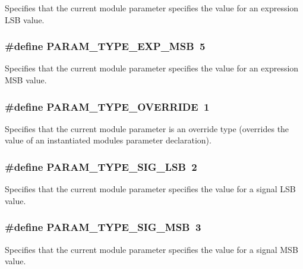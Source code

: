 Specifies that the current module parameter specifies the value for an expression LSB value. 
\subsubsection{\setlength{\rightskip}{0pt plus 5cm}\#define PARAM\_\-TYPE\_\-EXP\_\-MSB\ 5}\label{group__param__suppl_a7}


Specifies that the current module parameter specifies the value for an expression MSB value. 
\subsubsection{\setlength{\rightskip}{0pt plus 5cm}\#define PARAM\_\-TYPE\_\-OVERRIDE\ 1}\label{group__param__suppl_a3}


Specifies that the current module parameter is an override type (overrides the value of an instantiated modules parameter declaration). 
\subsubsection{\setlength{\rightskip}{0pt plus 5cm}\#define PARAM\_\-TYPE\_\-SIG\_\-LSB\ 2}\label{group__param__suppl_a4}


Specifies that the current module parameter specifies the value for a signal LSB value. 
\subsubsection{\setlength{\rightskip}{0pt plus 5cm}\#define PARAM\_\-TYPE\_\-SIG\_\-MSB\ 3}\label{group__param__suppl_a5}


Specifies that the current module parameter specifies the value for a signal MSB value. 